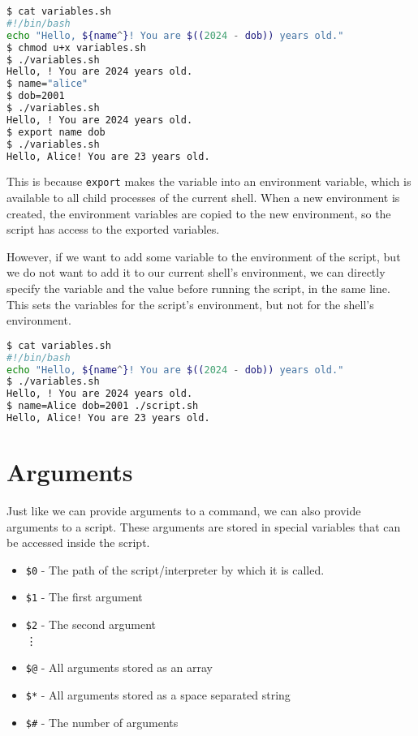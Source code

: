 \begin{lstlisting}[language=bash]
$ cat variables.sh
#!/bin/bash
echo "Hello, ${name^}! You are $((2024 - dob)) years old."
$ chmod u+x variables.sh
$ ./variables.sh
Hello, ! You are 2024 years old.
$ name="alice"
$ dob=2001
$ ./variables.sh
Hello, ! You are 2024 years old.
$ export name dob
$ ./variables.sh
Hello, Alice! You are 23 years old.
\end{lstlisting}

This is because \lstinline{export} makes the variable into an environment variable, which is available to all child processes of the current shell.
When a new environment is created, the environment variables are copied to the new environment, so the script has access to the exported variables.

However, if we want to add some variable to the environment of the script, but we do not want to add it to our current shell's environment, we can directly specify the variable and the value before running the script, in the same line. This sets the variables for the script's environment, but not for the shell's environment.

\begin{lstlisting}[language=bash]
$ cat variables.sh
#!/bin/bash
echo "Hello, ${name^}! You are $((2024 - dob)) years old."
$ ./variables.sh
Hello, ! You are 2024 years old.
$ name=Alice dob=2001 ./script.sh
Hello, Alice! You are 23 years old.
\end{lstlisting}

\section{Arguments}

Just like we can provide arguments to a command, we can also provide arguments to a script. These arguments are stored in special variables that can be accessed inside the script.

\begin{itemize}
    \item \lstinline{$0} - The path of the script/interpreter by which it is called.
    \item \lstinline{$1} - The first argument
    \item \lstinline{$2} - The second argument
    \\
    \vdots
    \item \lstinline{$@} - All arguments stored as an array
    \item \lstinline{$*} - All arguments stored as a space separated string
    \item \lstinline{$#} - The number of arguments
\end{itemize}

